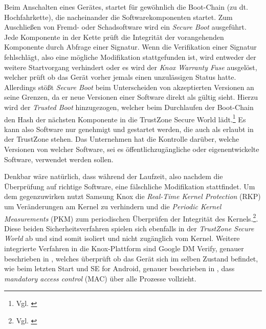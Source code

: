 Beim Anschalten eines Gerätes, startet für gewöhnlich die Boot-Chain (zu dt. Hochfahrkette), die nacheinander die Softwarekomponenten startet. Zum Auschließen von Fremd- oder Schadsoftware wird ein \textit{Secure Boot} ausgeführt. Jede Komponente in der Kette prüft die Integrität der vorangehenden Komponente durch Abfrage einer Signatur. Wenn die Verifikation einer Signatur fehlschlägt, also eine mögliche Modifikation stattgefunden ist, wird entweder der weitere Startvorgang verhindert oder es wird der \textit{Knox Warranty Fuse} ausgelöst, welcher prüft ob das Gerät vorher jemals einen unzulässigen Status hatte. Allerdings stößt \textit{Secure Boot} beim Unterscheiden von akzeptierten Versionen an seine Grenzen, da er neue Versionen einer Software direkt als gültig sieht. Hierzu wird der \textit{Trusted Boot} hinzugezogen, welcher beim Durchlaufen der Boot-Chain den Hash der nächsten Komponente in die TrustZone Secure World lädt.\footnote{Vgl. \cite{sam2017d} } Es kann also Software nur genehmigt und gestartet werden, die auch als erlaubt in der TrustZone stehen. Das Unternehmen hat die Kontrolle darüber, welche Versionen von welcher Software, sei es öffentlichzugängliche oder eigenentwickelte Software, verwendet werden sollen. 

Denkbar wäre natürlich, dass während der Laufzeit, also nachdem die Überprüfung auf richtige Software, eine fälschliche Modifikation stattfindet. Um dem gegenzuwirken nutzt Samsung Knox die \textit{Real-Time Kernel Protection} (RKP) um Veränderungen am Kernel zu verhindern und die \textit{Periodic Kernel Measurements} (PKM) zum periodischen Überprüfen der Integrität des Kernels.\footnote{Vgl. \cite{sam2017d} }. Diese beiden Sicherheitsverfahren spielen sich ebenfalls in der \textit{TrustZone Secure World} ab und sind somit isoliert und nicht zugänglich vom Kernel.
Weitere integrierte Verfahren in die Knox-Plattform sind Google DM Verify, genauer beschrieben in \cite{Goo2017a}, welches überprüft ob das Gerät sich im selben Zustand befindet, wie beim letzten Start und SE for Android, genauer beschrieben in \cite{Goo2017b}, dass \textit{mandatory access control} (MAC) über alle Prozesse vollzieht.

